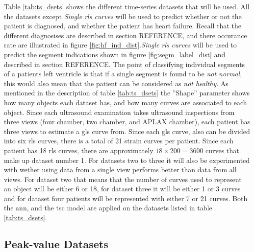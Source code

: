 Table \ref{tab:ts_dsets} shows the different time-series datasets that will be used. 
All the datasets except \textit{Single \acrshort{rls} curves} will be used to predict whether or not the patient is diagnosed, and whether the patient has heart failure. Recall that the different diagnosises are described in section REFERENCE, and there occurance rate are illustrated in figure \ref{fig:hf_ind_dist}.\textit{Single \acrshort{rls} curves} will be used to predict the segment indications shown in figure \ref{fig:segm_label_dist} and described in section REFERENCE. The point of classifying individual segments of a patients left ventricle is that if a single segment is found to be \textit{not normal}, this would also mean that the patient can be considered as \textit{not healthy}. As mentioned in the description of table \ref{tab:ts_dsets} the ''Shape'' parameter shows how many objects each dataset has, and how many curves are associated to each object. Since each ultrasound examination takes ultrasound inspections from three views (four chamber, two chamber, and APLAX chamber), each patient has three views to estimate a \acrshort{gls} curve from. Since each \acrshort{gls} curve, also can be divided into six \acrshort{rls} curves, there is a total of 21 strain curves per patient. Since each patient has 18 \acrshort{rls} curves, there are approximately $18 \times 200 = 3600$ curves that make up dataset number 1. For datasets two to three it will also be experimented with wether using data from a single view performs better than data from all views. For dataset two that means that the number of curves used to represent an object will be either 6 or 18, for dataset three it will be either 1 or 3 curves and for dataset four patients will be represented with either 7 or 21 curves. Both the \acrshort{ann}, and the \acrshort{tsc} model are applied on the datasets listed in table \ref{tab:ts_dsets}. \bigskip

\subsection{Peak-value Datasets}

